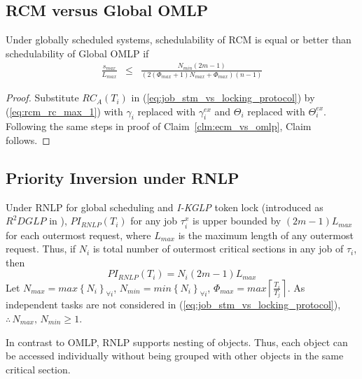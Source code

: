 \subsection{RCM versus Global OMLP}\label{subsec:rcm_vs_omlp}
%
\begin{clm}\label{clm:rcm_vs_omlp}
%
Under globally scheduled systems, schedulability of RCM is equal or
better than schedulability of Global OMLP if 
\begin{eqnarray}
\frac{s_{max}}{L_{max}} & \le & \frac{N_{min}\left(2m-1\right)}{\left(2\left(\Phi_{max}+1\right)N_{max}+\Phi_{max}\right)(n-1)}\label{eq:rcm_omlp_cmp_final}
\end{eqnarray}
%
\end{clm}
%
\begin{proof}
%
Substitute $RC_{A}(T_{i})$ in (\ref{eq:job_stm_vs_locking_protocol})
by (\ref{eq:rcm_rc_max_1}) with $\gamma_i$ replaced with $\gamma_i^{ex}$ and $\Theta_i$ replaced with $\Theta_i^{ex}$. Following the same steps in proof of Claim~\ref{clm:ecm_vs_omlp}, Claim follows.
%
\end{proof}
%
\subsection{Priority Inversion under RNLP}\label{subsec:pi_rnlp}
%
Under RNLP\cite{6257574} for global scheduling and \textit{I-KGLP} token lock (introduced as $R^2DGLP$ in \cite{6300160}), $PI_{RNLP}(T_{i})$ for any job $\tau_{i}^{x}$ is upper bounded by $\left(2m-1\right)L_{max}$ for each outermost request, where $L_{max}$ is the maximum length
of any outermost request. Thus, if $N_{i}$ is total number of outermost critical sections in any job of $\tau_{i}$, then 
%
\begin{equation}
PI_{RNLP}(T_{i})=N_{i}(2m-1)L_{max}
\label{eq:rnlp_pi}
\end{equation}
%
Let $N_{max}=max\left\{ N_{i}\right\}_{\forall i} $, $N_{min}=min\left\{ N_{i}\right\}_{\forall i} $,
$\Phi_{max}=max\left\lceil\frac{T_i}{T_j}\right\rceil$. As independent tasks are not considered in (\ref{eq:job_stm_vs_locking_protocol}),
$\therefore\, N_{max},\, N_{min}\ge1$.

In contrast to OMLP, RNLP supports nesting of objects. Thus, each object can be accessed individually without being grouped with other objects in the same critical section.
%
